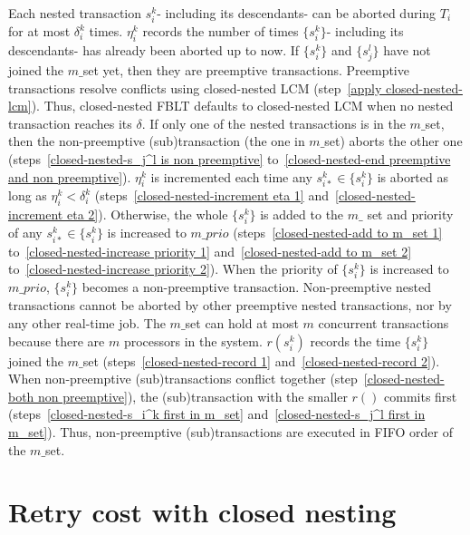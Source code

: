 \documentclass[letter]{sig-alternate}
\begin{document}
%
Each nested transaction $s_{i}^{k}$- including its descendants- can be aborted during $T_i$ for at most $\delta_{i}^{k}$ times. $\eta_{i}^{k}$ records  the number of times $\{s_{i}^{k}\}$- including its descendants- has already been aborted up to now. If $\{s_i^k\}$ and $\{s_j^l\}$ have not joined the $m\_$set yet, then they are preemptive transactions. Preemptive transactions resolve conflicts using closed-nested LCM (step~\ref{apply closed-nested-lcm}). Thus, closed-nested FBLT defaults to closed-nested LCM when no nested transaction reaches its $\delta$. If only one of the nested transactions is in the $m\_$set, then the non-preemptive (sub)transaction (the one in $m\_$set) aborts the other one (steps~\ref{closed-nested-s_j^l is non preemptive} to~\ref{closed-nested-end preemptive and non preemptive}). $\eta_i^k$ is incremented each time any $s_{i*}^k \in \{s_i^k\}$ is aborted as long as $\eta_i^k < \delta_i^k$ (steps~\ref{closed-nested-increment eta 1} and~\ref{closed-nested-increment eta 2}). Otherwise, the whole $\{s_i^k\}$ is added to the $m\_$ set and priority of any $s_{i*}^k \in \{s_i^k\}$ is increased to $m\_prio$ (steps~\ref{closed-nested-add to m_set 1} to~\ref{closed-nested-increase priority 1} and~\ref{closed-nested-add to m_set 2} to~\ref{closed-nested-increase priority 2}). When the priority of $\{s_i^k\}$ is increased to $m\_prio$, $\{s_i^k\}$ becomes a non-preemptive transaction. Non-preemptive nested transactions cannot be aborted by other preemptive nested transactions, nor by any other real-time job. The $m\_$set can hold at most $m$ concurrent transactions because there are $m$ processors in the system. $r(s_i^k)$ records the time $\{s_i^k\}$ joined the $m\_$set (steps~\ref{closed-nested-record 1} and~\ref{closed-nested-record 2}). When non-preemptive (sub)transactions conflict together (step~\ref{closed-nested-both non preemptive}), the (sub)transaction with the smaller $r()$ commits first (steps~\ref{closed-nested-s_i^k first in m_set} and~\ref{closed-nested-s_j^l first in m_set}). Thus, non-preemptive (sub)transactions are executed in FIFO order of the $m\_$set.

\section{Retry cost with closed nesting}\label{sec:closed_nested_fblt rc}
\end{document}
